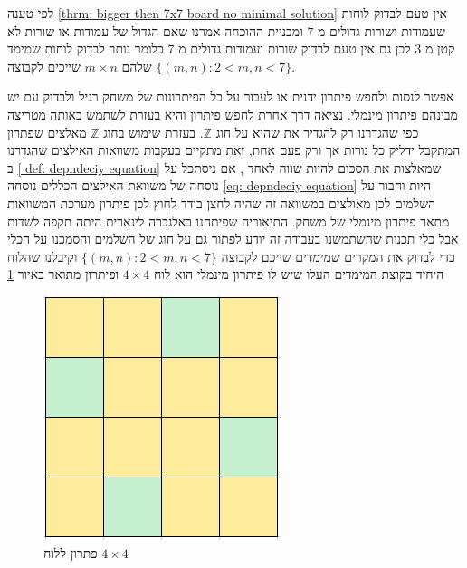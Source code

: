 \documentclass[12pt,twoside]{article}
\begin{document}
לפי טענה 
\ref{thrm: bigger then 7x7 board no minimal solution} 
אין טעם לבדוק לוחות שעמודות ושורות גדולים מ
$7$
ומבניית ההוכחה 
אמרנו שאם 
הגדול של עמודות או שורות לא קטן
מ
$3$
לכן גם אין טעם לבדוק 
שורות ועמודות גדולים מ
$7$
כלומר נותר לבדוק לוחות שמימד שלהם 
$m \times n$
שייכים לקבוצה
$\{ (m,n) : 2 < m,n <7 \}$.

אפשר לנסות ולחפש פיתרון ידנית
או לעבור על כל הפיתרונות של משחק רגיל ולבדוק עם יש מבינהם פיתרון 
מינמלי.
נציאה דרך אחרת לחפש פיתרון 
והיא בעזרת לשתמש באותה מטריצה כפי שהגדרנו רק להגדיר 
את שהיא על חוג 
$\mathbb{Z}$.
בעזרת שימוש בחוג 
$\mathbb{Z}$
מאלצים שפתרון המתקבל 
ידליק כל נורות אך ורק פעם אחת,
זאת מתקיים בעקבות 
משוואות האילצים שהגדרנו ב
\ref{ def: depndeciy equation}
שמאלצות את הסכום להיות שווה לאחד
,
אם ניסתכל על נוסחה של משוואת האילצים הכללים 
נוסחה
\ref{eq: depndeciy equation}
היות וחבור על השלמים לכן 
מאולצים במשוואה זה שהיה לחצן בודד לחוץ 
לכן פיתרון מערכת המשוואות מתאר פיתרון 
מינמלי של משחק.
התיאוריה שפיתחנו באלגברה לינארית היתה תקפה לשדות 
אבל כלי תכנות שהשתמשנו
בעבודה זה יודע לפתור גם על חוג של השלמים 
והסמכנו על הכלי כדי לבדוק את המקרים
שמימדים שייכם לקבוצה 
$\{ (m,n) : 2 < m,n <7 \}$
וקיבלנו שהלוח
היחיד בקוצת המימדים העלו שיש לו פיתרון מינמלי 
הוא
לוח 
$4 \times 4$
ופיתרון מתואר באיור 
\ref{fig:4x4_have_min_sol}

\begin{figure}[ht]
    \caption{פתרון ללוח 
    $4 \times 4$}
    \label{fig:4x4_have_min_sol}
    \unsethebrew
    \centering
    \includegraphics[width=.7\textwidth,height=.7\textheight,keepaspectratio]{images/4x4_min_sol.PNG}
\end{figure}
\sethebrew
\end{document}
